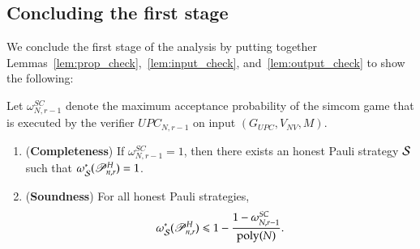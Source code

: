 %


\subsection{Concluding the first stage}

We conclude the first stage of the analysis by putting together Lemmas~\ref{lem:prop_check},~\ref{lem:input_check}, and~\ref{lem:output_check} to show the following:

\begin{lemma}
\label{lem:first_stage}
Let $\omega_{N,r-1}^{SC}$ denote the maximum acceptance probability of the simcom game that is executed by the verifier $UPC_{N,r-1}$ on input $(G_{UPC},V_{NV},M)$. 
\begin{enumerate}
	\item (\textbf{Completeness}) If $\omega_{N,r-1}^{SC} = 1$, then there exists an honest Pauli strategy $\mathcal{S}$ such that $\omega^{*}_{\mathcal{S}}(\mathscr{P}^H_{n,r}) = 1$.
	
	\item (\textbf{Soundness}) For all honest Pauli strategies, 
\[
	\omega^{*}_{\mathcal{S}}(\mathscr{P}^H_{n,r}) \leqslant 1 - \frac{1 - \omega_{N,r-1}^{SC}}{\operatorname{poly}(N)}.
\] 
\end{enumerate}
\end{lemma}






